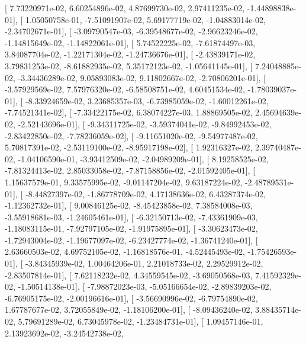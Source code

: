 \documentclass{article}
\begin{document}
       [  7.73220971e-02,   6.60254896e-02,   4.87699730e-02,
          2.97411235e-02,  -1.44898838e-01],
       [  1.05050758e-01,  -7.51091907e-02,   5.69177719e-02,
         -1.04883014e-02,  -2.34702671e-01],
       [ -3.09790547e-03,  -6.39548677e-02,  -2.96623246e-02,
         -1.14815649e-02,  -1.14822061e-01],
       [  5.74522225e-02,  -7.61874497e-03,   3.84087704e-02,
         -1.22171304e-02,  -1.24736676e-01],
       [ -2.43839171e-02,   3.79831253e-02,  -8.61882935e-02,
          5.35172123e-02,  -1.05641145e-01],
       [  7.24048885e-02,  -3.34436289e-02,   9.05893083e-02,
          9.11802667e-02,  -2.70806201e-01],
       [ -3.57929569e-02,   7.57976320e-02,  -6.58508751e-02,
          4.60451534e-02,  -1.78039037e-01],
       [ -8.33924659e-02,   3.23685357e-03,  -6.73985059e-02,
         -1.60012261e-02,  -7.74521341e-02],
       [ -7.33422175e-02,   6.38074227e-03,   1.88869505e-02,
          2.45694639e-02,  -2.52143696e-01],
       [ -9.34311725e-02,  -3.59374041e-02,  -9.84992453e-02,
         -2.83422850e-02,  -7.78236059e-02],
       [ -9.11651020e-02,  -9.54977487e-02,   5.70817391e-02,
         -2.53119100e-02,  -8.95917198e-02],
       [  1.92316327e-02,   2.39740487e-02,  -1.04106590e-01,
         -3.93412509e-02,  -2.04989209e-01],
       [  8.19258525e-02,  -7.81324413e-02,   2.85033058e-02,
         -7.87158856e-02,  -2.01592405e-01],
       [  1.15637579e-01,   9.33575995e-02,  -9.01147204e-02,
          9.63187224e-02,  -2.48789531e-01],
       [ -8.44827397e-02,  -1.86778709e-02,   4.17138636e-02,
          6.43287374e-02,  -1.12362732e-01],
       [  9.00846125e-02,  -8.45423858e-02,   7.38584008e-03,
         -3.55918681e-03,  -1.24605461e-01],
       [ -6.32150713e-02,  -7.43361909e-03,  -1.18083115e-01,
         -7.92797105e-02,  -1.91975895e-01],
       [ -3.30623473e-02,  -1.72943004e-02,  -1.19677097e-02,
         -6.23427774e-02,  -1.36741240e-01],
       [  2.63660503e-02,   4.69752105e-02,  -1.16818576e-01,
         -4.52445493e-02,  -1.75426593e-01],
       [ -3.84345939e-02,   1.00464206e-01,   2.21018733e-02,
          2.29529912e-02,  -2.83507814e-01],
       [  7.62118232e-02,   4.34559545e-02,  -3.69050568e-03,
          7.41592329e-02,  -1.50514138e-01],
       [ -7.98872023e-03,  -5.05166654e-02,  -2.89839203e-02,
         -6.76905175e-02,  -2.00196616e-01],
       [ -3.56690996e-02,  -6.79754890e-02,   1.67787677e-02,
          3.72055849e-02,  -1.18106200e-01],
       [ -8.09436240e-02,   3.88435714e-02,   5.79691289e-02,
          6.73045978e-02,  -1.23484731e-01],
       [  1.09457146e-01,   2.13923692e-02,  -3.24542738e-02,
\end{document}
